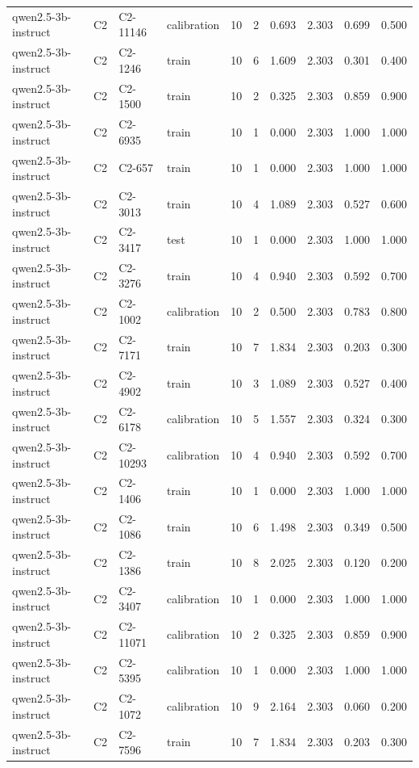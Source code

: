 \begin{table}
\begin{tabular}{llllrrrrrr}
qwen2.5-3b-instruct & C2 & C2-11146 & calibration & 10 & 2 & 0.693 & 2.303 & 0.699 & 0.500 \\
qwen2.5-3b-instruct & C2 & C2-1246 & train & 10 & 6 & 1.609 & 2.303 & 0.301 & 0.400 \\
qwen2.5-3b-instruct & C2 & C2-1500 & train & 10 & 2 & 0.325 & 2.303 & 0.859 & 0.900 \\
qwen2.5-3b-instruct & C2 & C2-6935 & train & 10 & 1 & 0.000 & 2.303 & 1.000 & 1.000 \\
qwen2.5-3b-instruct & C2 & C2-657 & train & 10 & 1 & 0.000 & 2.303 & 1.000 & 1.000 \\
qwen2.5-3b-instruct & C2 & C2-3013 & train & 10 & 4 & 1.089 & 2.303 & 0.527 & 0.600 \\
qwen2.5-3b-instruct & C2 & C2-3417 & test & 10 & 1 & 0.000 & 2.303 & 1.000 & 1.000 \\
qwen2.5-3b-instruct & C2 & C2-3276 & train & 10 & 4 & 0.940 & 2.303 & 0.592 & 0.700 \\
qwen2.5-3b-instruct & C2 & C2-1002 & calibration & 10 & 2 & 0.500 & 2.303 & 0.783 & 0.800 \\
qwen2.5-3b-instruct & C2 & C2-7171 & train & 10 & 7 & 1.834 & 2.303 & 0.203 & 0.300 \\
qwen2.5-3b-instruct & C2 & C2-4902 & train & 10 & 3 & 1.089 & 2.303 & 0.527 & 0.400 \\
qwen2.5-3b-instruct & C2 & C2-6178 & calibration & 10 & 5 & 1.557 & 2.303 & 0.324 & 0.300 \\
qwen2.5-3b-instruct & C2 & C2-10293 & calibration & 10 & 4 & 0.940 & 2.303 & 0.592 & 0.700 \\
qwen2.5-3b-instruct & C2 & C2-1406 & train & 10 & 1 & 0.000 & 2.303 & 1.000 & 1.000 \\
qwen2.5-3b-instruct & C2 & C2-1086 & train & 10 & 6 & 1.498 & 2.303 & 0.349 & 0.500 \\
qwen2.5-3b-instruct & C2 & C2-1386 & train & 10 & 8 & 2.025 & 2.303 & 0.120 & 0.200 \\
qwen2.5-3b-instruct & C2 & C2-3407 & calibration & 10 & 1 & 0.000 & 2.303 & 1.000 & 1.000 \\
qwen2.5-3b-instruct & C2 & C2-11071 & calibration & 10 & 2 & 0.325 & 2.303 & 0.859 & 0.900 \\
qwen2.5-3b-instruct & C2 & C2-5395 & calibration & 10 & 1 & 0.000 & 2.303 & 1.000 & 1.000 \\
qwen2.5-3b-instruct & C2 & C2-1072 & calibration & 10 & 9 & 2.164 & 2.303 & 0.060 & 0.200 \\
qwen2.5-3b-instruct & C2 & C2-7596 & train & 10 & 7 & 1.834 & 2.303 & 0.203 & 0.300 \\

\end{tabular}
\end{table}
